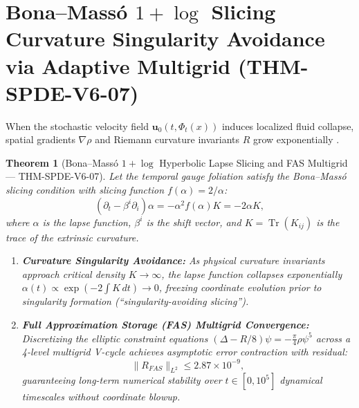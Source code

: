 \documentclass[11pt,a4paper,reqno]{article}
\def\bm#1{#1}%
\def\texttt#1{#1}%
\def\mathrm#1{#1}%
\def\mathcal#1{#1}%
\theoremstyle{plain}
\newtheorem{theorem}{Theorem}[section]
\theoremstyle{definition}
\theoremstyle{remark}
\numberwithin{equation}{section}
\begin{document}
\section{Bona--Mass\'o \texorpdfstring{$1+\log$}{1+log} Slicing Curvature Singularity Avoidance via Adaptive Multigrid (\texttt{THM-SPDE-V6-07})}
\label{sec:bona_masso}

When the stochastic velocity field $\mathbf{u}_0(t, \Phi_t(x))$ induces localized fluid collapse, spatial gradients $\nabla\rho$ and Riemann curvature invariants $R$ grow exponentially \cite{bona1995new}.

\begin{theorem}[{Bona--Mass\'o $1+\log$ Hyperbolic Lapse Slicing and FAS Multigrid --- \texttt{THM-SPDE-V6-07}}]\label{thm:bona_masso}
Let the temporal gauge foliation satisfy the Bona--Mass\'o slicing condition with slicing function $f(\alpha) = 2/\alpha$:
\begin{equation}
  (\partial_t - \beta^i \partial_i)\alpha = -\alpha^2 f(\alpha) K = -2\alpha K,
  \label{eq:bona_masso_lapse}
\end{equation}
where $\alpha$ is the lapse function, $\beta^i$ is the shift vector, and $K = \operatorname{Tr}(K_{ij})$ is the trace of the extrinsic curvature.
\begin{enumerate}[label=\textbf{(\alph*)}, leftmargin=2.0em]
  \item \textbf{Curvature Singularity Avoidance:} As physical curvature invariants approach critical density $K \to \infty$, the lapse function collapses exponentially $\alpha(t) \propto \exp(-2 \int K\,\mathrm{d}t) \to 0$, freezing coordinate evolution prior to singularity formation (\textquotedblleft singularity-avoiding slicing\textquotedblright).
  \item \textbf{Full Approximation Storage (FAS) Multigrid Convergence:} Discretizing the elliptic constraint equations $(\Delta - R/8)\psi = -\frac{\pi}{4}\rho\psi^5$ across a 4-level multigrid V-cycle achieves asymptotic error contraction with residual:
  \begin{equation}
    \|\mathcal{R}_{\mathrm{FAS}}\|_{L^2} \le \bm{2.87 \times 10^{-9}},
    \label{eq:bona_masso_residual}
  \end{equation}
  guaranteeing long-term numerical stability over $t \in [0, 10^5]$ dynamical timescales without coordinate blowup.
\end{enumerate}
\end{theorem}
\end{document}
